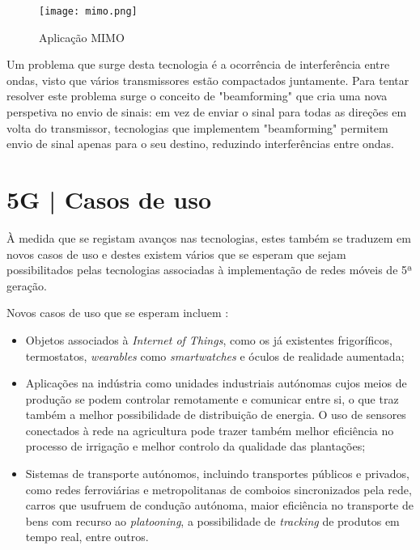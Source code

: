 \documentclass{llncs}
\begin{document}
\begin{figure}
    \centering
    \texttt{[image: mimo.png]}
    \caption{Aplicação MIMO \cite{MIMO}}
\end{figure}

\hspace*{1.5em} Um problema que surge desta tecnologia é a ocorrência de interferência entre ondas, visto que vários transmissores estão compactados juntamente. Para tentar resolver este problema surge o conceito de "beamforming" que cria uma nova perspetiva no envio de sinais: em vez de enviar o sinal para todas as direções em volta do transmissor, tecnologias que implementem "beamforming" permitem envio de sinal apenas para o seu destino, reduzindo interferências entre ondas.

\section{5G | Casos de uso }

À medida que se registam avanços nas tecnologias, estes também se traduzem em novos casos de uso e destes existem vários que se esperam que sejam possibilitados pelas tecnologias associadas à implementação de redes móveis de 5ª geração.

Novos casos de uso que se esperam incluem :
\begin{itemize}
	\item Objetos associados à \textit{Internet of Things}, como os já existentes frigoríficos, termostatos, \textit{wearables} como \textit{smartwatches} e óculos de realidade aumentada;
	\item Aplicações na indústria como unidades industriais autónomas cujos meios de produção se podem controlar remotamente e comunicar entre si, o que traz também a melhor possibilidade de distribuição de energia. O uso de sensores conectados à rede na agricultura pode trazer também melhor eficiência no processo de irrigação e melhor controlo da qualidade das plantações;
	\item Sistemas de transporte autónomos, incluindo transportes públicos e privados, como redes ferroviárias e metropolitanas de comboios sincronizados pela rede, carros que usufruem de condução autónoma, maior eficiência no transporte de bens com recurso ao \textit{platooning}, a possibilidade de \textit{tracking} de produtos em tempo real, entre outros.
\end{itemize}
\end{document}
